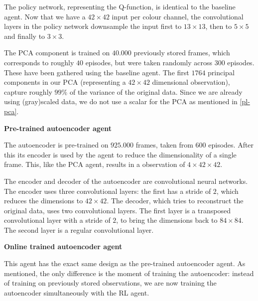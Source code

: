 The policy network, representing the Q-function, is identical to the baseline agent. Now that we have a $42 \times 42$ input per colour channel, the convolutional layers in the policy network downsample the input first to $13 \times 13$, then to $5 \times 5$ and finally to $3 \times 3$.

The PCA component is trained on $40.000$ previously stored frames, which corresponds to roughly $40$ episodes, but were taken randomly across $300$ episodes. These have been gathered using the baseline agent. The first $1764$ principal components in our PCA (representing a $42 \times 42$ dimensional observation), capture roughly $99\%$ of the variance of the original data. Since we are already using (gray)scaled data, we do not use a scalar for the PCA  as mentioned in \ref{pl-pca}. \newline\par

\noindent \textbf{Pre-trained autoencoder agent}\par
\noindent The autoencoder is pre-trained on $925.000$ frames, taken from $600$ episodes. After this its encoder is used by the agent to reduce the dimensionality of a single frame. This, like the PCA agent, results in a observation of $4 \times 42 \times 42$.

The encoder and decoder of the autoencoder are convolutional neural networks. The encoder uses three convolutional layers: the first has a stride of $2$, which reduces the dimensions to $42 \times 42$. The decoder, which tries to reconstruct the original data, uses two convolutional layers. The first layer is a transposed convolutional layer with a stride of $2$, to bring the dimensions back to $84 \times 84$. The second layer is a regular convolutional layer. \newline\par
 
\noindent \textbf{Online trained autoencoder agent}\par
\noindent  This agent has the exact same design as the pre-trained autoencoder agent. As mentioned, the only difference is the moment of training the autoencoder: instead of training on previously stored observations, we are now training the autoencoder simultaneously with the RL agent.

